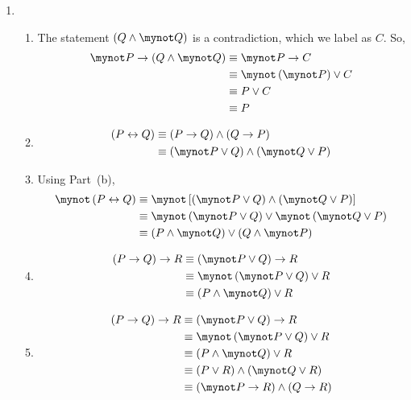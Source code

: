 \begin{enumerate}
\item \begin{enumerate}
\item The statement $\left( Q \wedge \mynot Q \right)$ is a contradiction, which we label as 
$C$. So,
\begin{align*}
\mynot P \to \left( Q \wedge \mynot Q \right) &\equiv \mynot P \to C \\
               &\equiv \mynot \left( \mynot P \right) \vee C \\
               &\equiv P \vee C \\
               &\equiv P
\end{align*}

\item \begin{align*}
\left( P \leftrightarrow Q \right) &\equiv \left( P \to Q \right) \wedge \left( Q \to P \right) \\
            &\equiv \left( \mynot P \vee Q \right) \wedge \left( \mynot Q \vee P \right)
\end{align*}

\item Using Part~(b), 
\begin{align*}
\mynot \left( P \leftrightarrow Q \right) &\equiv \mynot \left[ \left( \mynot P \vee Q \right) \wedge \left( \mynot Q \vee P \right) \right] \\
   &\equiv \mynot \left( \mynot P \vee Q \right) \vee \mynot \left( \mynot Q \vee P \right) \\
   &\equiv (P \wedge \mynot Q) \vee (Q \wedge \mynot P)
\end{align*}


\item \begin{align*}
\left(P \to Q \right) \to R &\equiv \left( \mynot P \vee Q \right) \to R \\
                     &\equiv \mynot \left( \mynot P \vee Q \right) \vee R \\
                     &\equiv \left( P \wedge \mynot Q \right) \vee R
\end{align*}


\item \begin{align*}
\left( P \to Q \right) \to R &\equiv \left( \mynot P \vee Q \right) \to R \\
           &\equiv \mynot \left( \mynot P \vee Q \right) \vee R \\
           &\equiv \left( P \wedge \mynot Q \right) \vee R \\
           &\equiv \left( P \vee R \right) \wedge \left( \mynot Q \vee R \right) \\
           &\equiv \left( \mynot P \to R \right) \wedge \left( Q \to R \right)
\end{align*}


\end{enumerate}
\end{enumerate}
